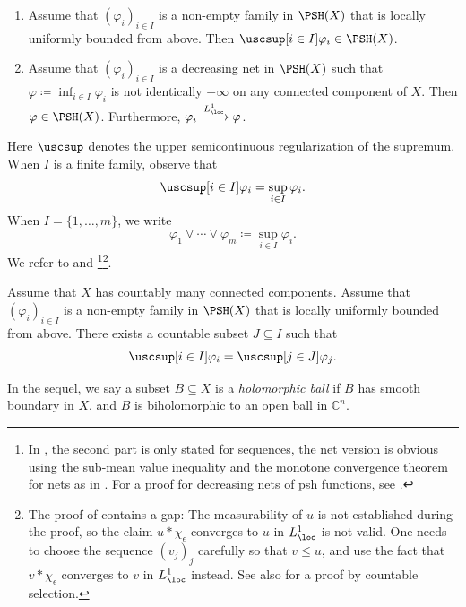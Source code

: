\begin{proposition}\label{prop:pshfunction_closedseq}
\leavevmode
\begin{enumerate}
    \item\label{itm:prop:pshfunction_closedseq:1} Assume that $(\varphi_i)_{i\in I}$ is a non-empty family in $\PSH(X)$ that is locally uniformly bounded from above. Then $\uscsup[i\in I] \varphi_i\in \PSH(X)$.
    \item\label{itm:prop:pshfunction_closedseq:2} Assume that $(\varphi_i)_{i\in I}$ is a decreasing net in $\PSH(X)$ such that $\varphi\coloneqq \inf_{i\in I}\varphi_i$ is not identically $-\infty$ on any connected component of $X$. Then $\varphi\in \PSH(X)$. Furthermore, $\varphi_i\xrightarrow{L^1_{\loc}} \varphi$.
\end{enumerate}
\end{proposition}
Here $\uscsup$ denotes the upper semicontinuous regularization of the supremum. When $I$ is a finite family, observe that
\[
\uscsup[i\in I]\varphi_i=  \sup_{i\in I}\varphi_i.
\]
When $I=\{1,\ldots,m\}$, we write
\[
    \varphi_1\lor \cdots\lor \varphi_m\coloneqq   \sup_{i\in I}\varphi_i.
\]
We refer to \cite[Proposition~1.28, Proposition~1.40]{GZ17} and \cite[Theorems~8.3.1--8.3.2]{FPT}\footnote{In \cite[Proposition~1.28]{GZ17}, the second part is only stated for sequences, the net version is obvious using the sub-mean value inequality and the monotone convergence theorem for nets as in \cite[Proposition~7.12]{Fol99}. For a proof for decreasing nets of psh functions, see \cite[Theorem~8.3.1]{FPT}.}\footnote{The proof of \cite[Proposition~1.40]{GZ17} contains a gap: The measurability of $u$ is not established during the proof, so the claim $u \ast \chi_{\epsilon}$ converges to $u$ in $L^1_{\loc}$ is not valid. One needs to choose the sequence $(v_j)_j$ carefully so that $v\leq u$, and use the fact that $v \ast \chi_{\epsilon}$ converges to $v$ in $L^1_{\loc}$ instead. See also \cite[Theorem~8.3.2]{FPT} for a proof by countable selection.}.

\begin{proposition}\label{prop:Choquet}
    Assume that $X$ has countably many connected components.
    Assume that $(\varphi_i)_{i\in I}$ is a non-empty family in $\PSH(X)$ that is locally uniformly bounded from above. There exists a countable subset $J\subseteq I$ such that
    \[
    \uscsup[i\in I] \varphi_i=\uscsup[j\in J] \varphi_j.
    \]
\end{proposition}
In the sequel, we say a subset $B\subseteq X$ is a \emph{holomorphic ball} if $B$ has smooth boundary in $X$, and $B$ is biholomorphic to an open ball in $\mathbb{C}^n$.


